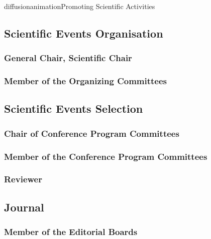 \documentclass{ra2018}
\begin{document}
\begin{module}{diffusion}{animation}{Promoting Scientific Activities}



\subsection{Scientific Events Organisation}
    \subsubsection{General Chair, Scientific Chair}
    

    \subsubsection{Member of the Organizing Committees}
\subsection {Scientific Events Selection}
    \subsubsection{Chair of Conference Program Committees}
    \subsubsection{Member of the Conference Program Committees}
    \subsubsection{Reviewer}
\subsection{Journal}
    \subsubsection{Member of the Editorial Boards}

\end{module}
\end{document}
